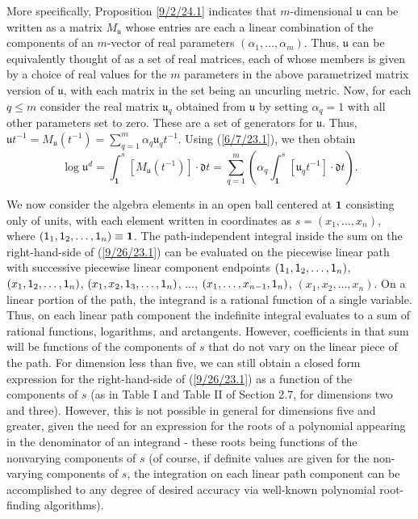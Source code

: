 \documentclass{amsart}
\numberwithin{equation}{section}
\theoremstyle{definition}
\numberwithin{theorem}{section}
\begin{document}
More specifically, Proposition \ref{9/2/24.1} indicates that $m$-dimensional $\mathfrak{u}$ can be written as a matrix $M_\mathfrak{u}$ whose entries are each a linear combination of the components of an $m$-vector of real parameters $(\alpha_1, \dots, \alpha_m)$.   Thus, $\mathfrak{u}$ can be equivalently thought of as a set of real matrices, each of whose members is given by a choice of real values for the $m$ parameters in the above parametrized matrix version of $\mathfrak{u}$, with each matrix in the set being an uncurling metric.  Now, for each $q\le m$ consider the real matrix  $\mathfrak{u}_q$ obtained from $\mathfrak{u}$ by setting $\alpha_q =1$ with all other parameters set to zero.  These are a set of generators for $\mathfrak{u}$. Thus, $\mathfrak{u}t^{-1} = M_{\mathfrak{u}}(t^{-1}) = \sum_{q=1}^m \alpha_q \mathfrak{u}_q t^{-1}$.   Using (\ref{6/7/23.1}), we then obtain \begin{equation}\label{9/26/23.1} \log  \mathfrak{u}^d = \int_{\mathbf{1}}^s [M_{\mathfrak{u}} (t^{-1})]\cdot \mathfrak{d}t =\sum_{q=1}^m \left(\alpha_q \int_{\mathbf{1}}^s [\mathfrak{u}_q t^{-1}]\cdot \mathfrak{d}t\right).\end{equation}  

We now consider the algebra elements in an open ball centered at $\mathbf{1}$ consisting only of units, with each element written in coordinates as $s = (x_1,\dots,x_n)$, where $({\sf 1}_1,{\sf 1}_2,\dots,{\sf 1}_n) \equiv \mathbf{1}$.  The path-independent integral inside the sum on the right-hand-side of (\ref{9/26/23.1}) can be evaluated on the piecewise linear path with successive piecewise linear component endpoints $({\sf 1}_1,{\sf 1}_2,\dots,{\sf 1}_n)$, $(x_1,{\sf 1}_2,\dots,{\sf 1}_n)$, $(x_1,x_2,{\sf 1}_3,\dots,{\sf 1}_n)$,  $\dots$, $(x_1,\dots, x_{n-1}, {\sf 1}_n)$, $(x_1,x_2,\dots,x_n)$.    On a linear portion of the path, the integrand is a rational function of a single variable.  Thus, on each linear path component the indefinite integral evaluates to a sum of rational functions, logarithms, and arctangents.  However, coefficients in that sum will be functions of the components of $s$ that do not vary on the linear piece of the path.  For dimension less than five, we can still obtain a closed form expression for the right-hand-side of (\ref{9/26/23.1}) as a function of the components of $s$ (as in Table I and Table II of Section 2.7, for dimensions two and three).  However, this is not possible in general for dimensions five and greater, given the need for an expression for the roots of a polynomial appearing in the denominator of an integrand - these roots being functions of the nonvarying components of $s$ (of course, if definite values are given for the non-varying components of $s$, the integration on each linear path component can be accomplished to any degree of desired accuracy via well-known polynomial root-finding algorithms).
\end{document}
